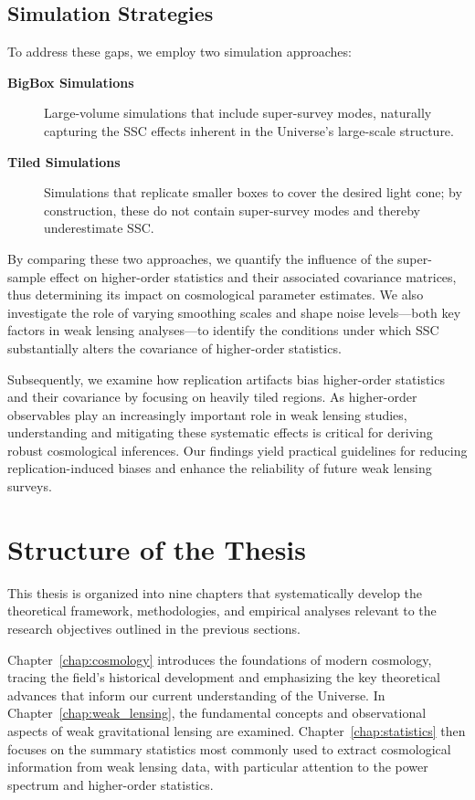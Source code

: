 \subsection{Simulation Strategies} 
To address these gaps, we employ two simulation approaches: 
\begin{description} 
    \item[\textbf{BigBox Simulations}] Large-volume simulations that include super-survey modes, naturally capturing the SSC effects inherent in the Universe's large-scale structure. 
    \item[\textbf{Tiled Simulations}] Simulations that replicate smaller boxes to cover the desired light cone; by construction, these do not contain super-survey modes and thereby underestimate SSC. 
\end{description}

By comparing these two approaches, we quantify the influence of the super-sample effect on higher-order statistics and their associated covariance matrices, thus determining its impact on cosmological parameter estimates. We also investigate the role of varying smoothing scales and shape noise levels—both key factors in weak lensing analyses—to identify the conditions under which SSC substantially alters the covariance of higher-order statistics.

Subsequently, we examine how replication artifacts bias higher-order statistics and their covariance by focusing on heavily tiled regions. As higher-order observables play an increasingly important role in weak lensing studies, understanding and mitigating these systematic effects is critical for deriving robust cosmological inferences. Our findings yield practical guidelines for reducing replication-induced biases and enhance the reliability of future weak lensing surveys.

\section{Structure of the Thesis}
This thesis is organized into nine chapters that systematically develop the theoretical framework, methodologies, and empirical analyses relevant to the research objectives outlined in the previous sections. 

Chapter~\ref{chap:cosmology} introduces the foundations of modern cosmology, tracing the field's historical development and emphasizing the key theoretical advances that inform our current understanding of the Universe. In Chapter~\ref{chap:weak_lensing}, the fundamental concepts and observational aspects of weak gravitational lensing are examined. Chapter~\ref{chap:statistics} then focuses on the summary statistics most commonly used to extract cosmological information from weak lensing data, with particular attention to the power spectrum and higher-order statistics.

